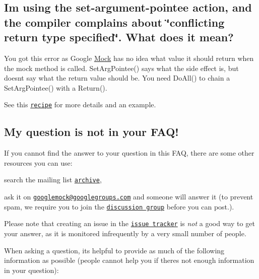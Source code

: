 \subsection*{I\textquotesingle{}m using the set-\/argument-\/pointee action, and the compiler complains about \char`\"{}conflicting return type specified\char`\"{}. What does it mean?}

You got this error as Google \hyperlink{classMock}{Mock} has no idea what value it should return when the mock method is called. {\ttfamily Set\+Arg\+Pointee()} says what the side effect is, but doesn\textquotesingle{}t say what the return value should be. You need {\ttfamily Do\+All()} to chain a {\ttfamily Set\+Arg\+Pointee()} with a {\ttfamily Return()}.

See this \href{CookBook.md#mocking-side-effects}{\tt recipe} for more details and an example.

\subsection*{My question is not in your F\+A\+Q!}

If you cannot find the answer to your question in this F\+AQ, there are some other resources you can use\+:


\begin{DoxyEnumerate}
\item search the mailing list \href{http://groups.google.com/group/googlemock/topics}{\tt archive},
\end{DoxyEnumerate}
\begin{DoxyEnumerate}
\item ask it on \href{mailto:googlemock@googlegroups.com}{\tt googlemock@googlegroups.\+com} and someone will answer it (to prevent spam, we require you to join the \href{http://groups.google.com/group/googlemock}{\tt discussion group} before you can post.).
\end{DoxyEnumerate}

Please note that creating an issue in the \href{https://github.com/google/googletest/issues}{\tt issue tracker} is {\itshape not} a good way to get your answer, as it is monitored infrequently by a very small number of people.

When asking a question, it\textquotesingle{}s helpful to provide as much of the following information as possible (people cannot help you if there\textquotesingle{}s not enough information in your question)\+:


